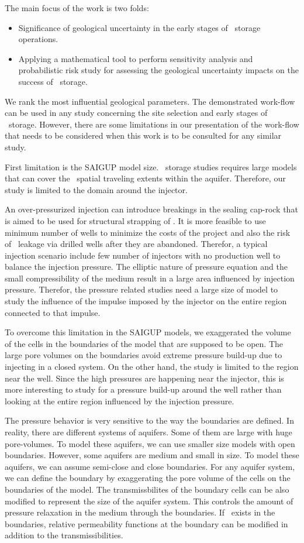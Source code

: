 The main focus of the work is two folds:
\begin{itemize}
\item Significance of geological uncertainty in the early stages of \coo\ storage operations.
\item Applying a mathematical tool to perform sensitivity analysis and probabilistic risk study for assessing the geological uncertainty impacts on the success of \coo\ storage. 
\end{itemize}
We rank the most influential geological parameters. The demonstrated work-flow can be used in any study concerning the site selection and early stages of \coo\ storage. However, there are some limitations in our presentation of the work-flow that needs to be considered when this work is to be consulted for any similar study.  

First limitation is the SAIGUP model size. \coo\ storage studies requires large models that can cover the \coo\ spatial traveling extents within the aquifer. Therefore, our study is limited to the domain around the injector.

An over-pressurized injection can introduce breakings in the sealing cap-rock that is aimed to be used for structural strapping of \coo. It is more feasible to use minimum number of wells to minimize the costs of the project and also the risk of \coo\ leakage via drilled wells after they are abandoned. Therefor, a typical injection scenario include few number of injectors with no production well to balance the injection pressure. The elliptic nature of pressure equation and the small compressibility of the medium result in a large area influenced by injection pressure. Therefor, the pressure related studies need a large size of model to study the influence of the impulse imposed by the injector on the entire region connected to that impulse.

To overcome this limitation in the SAIGUP models, we exaggerated the volume of the cells in the boundaries of the model that are supposed to be open. The large pore volumes on the boundaries avoid extreme pressure build-up due to injecting in a closed system. On the other hand, the study is limited to the region near the well. Since the high pressures are happening near the injector, this is more interesting to study for a pressure build-up around the well rather than looking at the entire region influenced by the injection pressure.

The pressure behavior is very sensitive to the way the boundaries are defined. In reality, there are different systems of aquifers. Some of them are large with huge pore-volumes. To model these aquifers, we can use smaller size models with open boundaries. However, some aquifers are medium and small in size. To model these aquifers, we can assume semi-close and close boundaries. For any aquifer system, we can define the boundary by exaggerating the pore volume of the cells on the boundaries of the model. The transmissbilites of the boundary cells can be also modified to represent the size of the aquifer system. This controls the amount of pressure relaxation in the medium through the boundaries. If \coo\ exists in the boundaries, relative permeability functions at the boundary can be modified in addition to the transmissibilities. 

